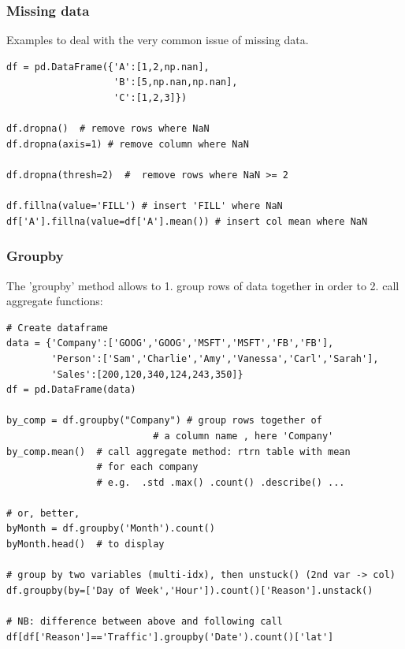 \documentclass[12pt]{article}
\begin{document}
\subsubsection{Missing data} 
Examples to deal with the very common issue of missing data.
\begin{lstlisting}
df = pd.DataFrame({'A':[1,2,np.nan], 
                   'B':[5,np.nan,np.nan],
                   'C':[1,2,3]})

df.dropna()  # remove rows where NaN
df.dropna(axis=1) # remove column where NaN

df.dropna(thresh=2)  #  remove rows where NaN >= 2

df.fillna(value='FILL') # insert 'FILL' where NaN
df['A'].fillna(value=df['A'].mean()) # insert col mean where NaN 
\end{lstlisting}

\subsubsection{Groupby}
The 'groupby' method allows to 1. group rows of data together in order to 2. call aggregate functions:
\begin{lstlisting}
# Create dataframe
data = {'Company':['GOOG','GOOG','MSFT','MSFT','FB','FB'],
        'Person':['Sam','Charlie','Amy','Vanessa','Carl','Sarah'],
        'Sales':[200,120,340,124,243,350]}
df = pd.DataFrame(data)

by_comp = df.groupby("Company") # group rows together of 
                          # a column name , here 'Company'
by_comp.mean()  # call aggregate method: rtrn table with mean 
                # for each company
                # e.g.  .std .max() .count() .describe() ...
                
# or, better,
byMonth = df.groupby('Month').count()
byMonth.head()  # to display

# group by two variables (multi-idx), then unstuck() (2nd var -> col)
df.groupby(by=['Day of Week','Hour']).count()['Reason'].unstack()

# NB: difference between above and following call 
df[df['Reason']=='Traffic'].groupby('Date').count()['lat']
\end{lstlisting}
\end{document}
